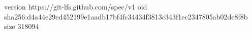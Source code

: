 version https://git-lfs.github.com/spec/v1
oid sha256:d4a44e29ed452199e1aadb17bf4fc34434f3813c343f1ec2347805ab02de8f8b
size 318094
